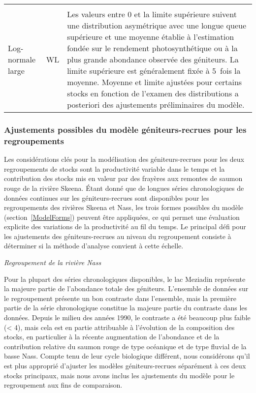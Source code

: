 \documentclass[french,11pt]{book}
\begin{document}
\begin{longtable}[t]{ll>{\raggedright\arraybackslash}p{31em}}
\midrule\\ Log-normale large & WL & Les valeurs entre 0 et la limite supérieure suivent une distribution asymétrique avec une longue queue supérieure et une moyenne établie à l'estimation fondée sur le rendement photosynthétique ou à la plus grande abondance observée des géniteurs. La limite supérieure est généralement fixée à 5 fois la moyenne. Moyenne et limite ajustées pour certains stocks en fonction de l'examen des distributions a posteriori des ajustements préliminaires du modèle.\\* \end{longtable}

\endgroup{} \endgroup{}

\clearpage

\subsubsection{Ajustements possibles du modèle géniteurs-recrues pour les regroupements}\label{CandidateAggModels}

Les considérations clés pour la modélisation des géniteurs-recrues pour les deux regroupements de stocks sont la productivité variable dans le temps et la contribution des stocks mis en valeur par des frayères aux remontes de saumon rouge de la rivière Skeena. Étant donné que de longues séries chronologiques de données continues sur les géniteurs-recrues sont disponibles pour les regroupements des rivières Skeena et Nass, les trois formes possibles du modèle (section~\ref{ModelForms}) peuvent être appliquées, ce qui permet une évaluation explicite des variations de la productivité au fil du temps. Le principal défi pour les ajustements des géniteurs-recrues au niveau du regroupement consiste à déterminer si la méthode d'analyse convient à cette échelle.

\emph{Regroupement de la rivière Nass}

Pour la plupart des séries chronologiques disponibles, le lac Meziadin représente la majeure partie de l'abondance totale des géniteurs. L'ensemble de données sur le regroupement présente un bon contraste dans l'ensemble, mais la première partie de la série chronologique constitue la majeure partie du contraste dans les données. Depuis le milieu des années 1990, le contraste a été beaucoup plus faible (\textless{} 4), mais cela est en partie attribuable à l'évolution de la composition des stocks, en particulier à la récente augmentation de l'abondance et de la contribution relative du saumon rouge de type océanique et de type fluvial de la basse Nass. Compte tenu de leur cycle biologique différent, nous considérons qu'il est plus approprié d'ajuster les modèles géniteurs-recrues séparément à ces deux stocks principaux, mais nous avons inclus les ajustements du modèle pour le regroupement aux fins de comparaison.
\end{document}
